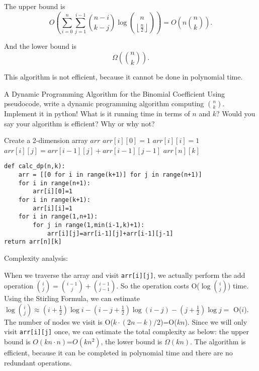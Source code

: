 \documentclass[UTF8, a4paper, linespread=1.5]{article}
\begin{document}
The upper bound is
$$O(\sum_{i=0}^n\sum_{j=1}^{i-1} \binom {n-i}{k-j} \log  \binom n {\left\lfloor \frac{n}{2} \right\rfloor }) = O(n \binom n k).$$

And the lower bound is
$$\Omega(\binom nk).$$

This algorithm is not efficient, because it cannot be done in polynomial time.
\newpage
\begin{thm}{A Dynamic Programming Algorithm for the Binomial Coefficient}{}
    Using pseudocode, 
    write a dynamic programming algorithm computing  $\binom{n}{k}$.  Implement it in python!  What is it running 
    time in terms of $n$ and $k$? Would you say your algorithm is efficient?  Why or why not?
    
\end{thm}
\begin{algorithm}
    \caption{Caluculate Binomial Coefficient Using DP}
    \begin{algorithmic}
        \STATE Create a 2-dimension array $arr$
        \STATE $arr[i][0]=1$
        \ENDFOR
        \STATE $arr[i][i]=1$
        \ENDFOR
        \STATE $arr[i][j]=arr[i-1][j]+arr[i-1][j-1]$
        \ENDFOR
        \ENDFOR
        \RETURN $arr[n][k]$
    \end{algorithmic}
\end{algorithm}
\begin{verbatim}
def calc_dp(n,k):
    arr = [[0 for i in range(k+1)] for j in range(n+1)]
    for i in range(n+1):
        arr[i][0]=1
    for i in range(k+1):
        arr[i][i]=1
    for i in range(1,n+1):
        for j in range(1,min(i-1,k)+1):
            arr[i][j]=arr[i-1][j]+arr[i-1][j-1]
return arr[n][k]
\end{verbatim}
Complexity analysis:

 When we traverse the array and visit \texttt{arr[i][j]}, we actually perform the add operation $\binom{i}{j}=\binom{i-1}{j}+\binom{i-1}{j-1}$. So the operation costs O($\log\binom{i}{j}$) time. Using the Stirling Formula, we can estimate $\log\binom{i}{j}\approx(i+\frac{1}{2})\log i-(i-j+\frac{1}{2})\log (i-j)-(j+\frac{1}{2})\log j =$ O($i$). The number of nodes we visit is O($k\cdot (2n-k)/2$)=O($kn$). Since we will only visit \texttt{arr[i][j]} once, we can estimate the total complexity as below: the upper bound is $O(kn\cdot n)$=$O(kn^2)$, the lower bound is $\Omega(kn)$. The algorithm is efficient, because it can be completed in polynomial time and there are no redundant operations.
\end{document}
